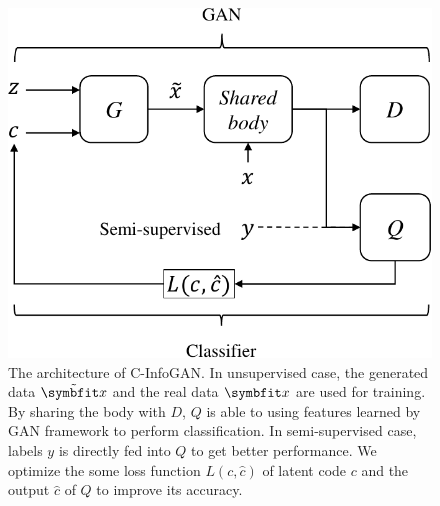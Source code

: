 \begin{figure}[htbp]
  \centering
  \includegraphics[scale=0.7]{Img/arch-cinfogan.pdf} 
  {The architecture of C-InfoGAN. In unsupervised case, the generated data $\tilde{\bd{x}}$ and the real data $\bd{x}$ are used for training. By sharing the body with $D$, $Q$ is able to using features learned by GAN framework to perform classification. In semi-supervised case, labels $y$ is directly fed into $Q$ to get better performance. We optimize the some loss function $L(c, \hat{c})$ of latent code $c$ and the output $\hat{c}$ of $Q$ to improve its accuracy.}
  \label{fig:c-infogan}
\end{figure}

